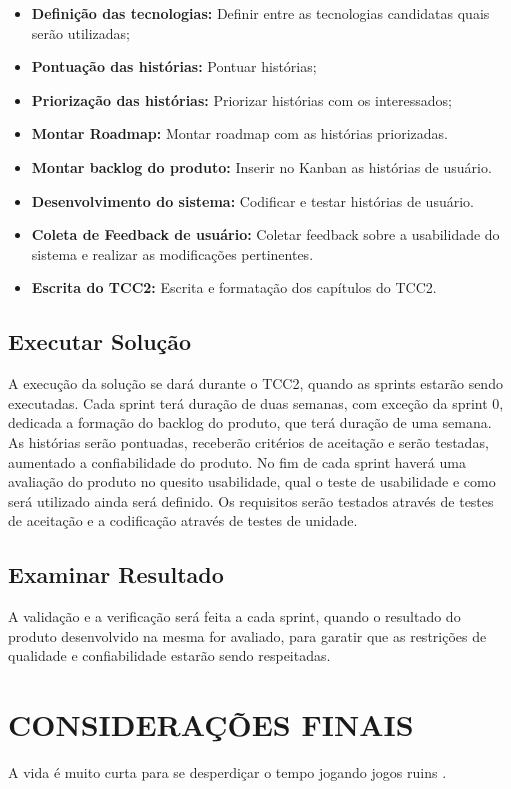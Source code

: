 \begin{itemize}
\item  \textbf {Definição das tecnologias:} Definir entre as tecnologias candidatas quais serão utilizadas;
\item  \textbf {Pontuação das histórias:} Pontuar histórias;
\item  \textbf {Priorização das histórias:} Priorizar histórias com os interessados;
\item  \textbf {Montar Roadmap:} Montar roadmap com as histórias priorizadas.
\item  \textbf {Montar backlog do produto:} Inserir no Kanban as histórias de usuário.
\item  \textbf{Desenvolvimento do sistema:} Codificar e testar histórias de usuário.
\item  \textbf{Coleta de Feedback de usuário:} Coletar feedback sobre a usabilidade do sistema e realizar as modificações pertinentes.
\item  \textbf{Escrita do TCC2:} Escrita e formatação dos capítulos do TCC2.
\end{itemize}

\section {Executar Solução}


A execução da solução se dará durante o TCC2, quando as sprints estarão sendo executadas. Cada sprint terá duração de duas semanas, com exceção da sprint 0, dedicada a formação do backlog do produto, que terá duração de uma semana. As histórias serão pontuadas, receberão critérios de aceitação e serão testadas, aumentado a confiabilidade do produto. No fim de cada sprint haverá uma avaliação do produto no quesito usabilidade, qual o teste de usabilidade e como será utilizado ainda será definido. Os requisitos serão testados através de testes de aceitação e a codificação através de testes de unidade.

\section {Examinar Resultado}

A validação e a verificação será feita a cada sprint, quando o resultado do produto desenvolvido na mesma for avaliado, para garatir que as restrições de qualidade e confiabilidade estarão sendo respeitadas. 




\chapter[Considerações finais]{CONSIDERAÇÕES FINAIS}


A vida é muito curta para se desperdiçar o tempo jogando jogos ruins \cite{chou2015actionable}. 
